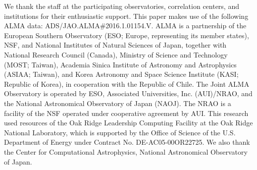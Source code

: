 We thank
the staff at the participating observatories, correlation
centers, and institutions for their enthusiastic support.
This paper makes use of the following ALMA data:
ADS/JAO.ALMA\#2016.1.01154.V. ALMA is a partnership
of the European Southern Observatory (ESO;
Europe, representing its member states), NSF, and
National Institutes of Natural Sciences of Japan, together
with National Research Council (Canada), Ministry
of Science and Technology (MOST; Taiwan),
Academia Sinica Institute of Astronomy and Astrophysics
(ASIAA; Taiwan), and Korea Astronomy and
Space Science Institute (KASI; Republic of Korea), in
cooperation with the Republic of Chile. The Joint
ALMA Observatory is operated by ESO, Associated
Universities, Inc. (AUI)/NRAO, and the National Astronomical
Observatory of Japan (NAOJ). The NRAO
is a facility of the NSF operated under cooperative agreement
by AUI.
This research used resources of the Oak Ridge Leadership Computing Facility at the Oak Ridge National
Laboratory, which is supported by the Office of Science of the U.S. Department of Energy under Contract
No. DE-AC05-00OR22725. We also thank the Center for Computational Astrophysics, National Astronomical Observatory of Japan.


